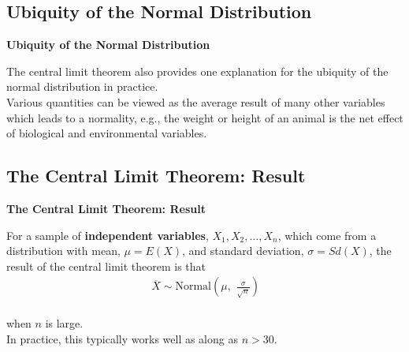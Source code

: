 \documentclass[compress]{beamer}        %
\makeatletter
\newcommand{\tcb}{\textcolor{beamer@blendedblue}}
\makeatother
\begin{document}
\subsection{Ubiquity of the Normal Distribution}
\begin{frame}{\bf \tcb{Ubiquity of the Normal Distribution}}

The central limit theorem also provides one explanation for the ubiquity of the normal distribution in practice.\\[1cm]

Various quantities can be viewed as the average result of many other variables which leads to a normality, e.g., the weight or height of an animal is the net effect of biological and environmental variables.

\end{frame}




\subsection{The Central Limit Theorem: Result}
\begin{frame}{\bf \tcb{The Central Limit Theorem: Result}}

For a sample of {\bf independent variables}, $X_1,X_2,\ldots,X_n$, which come from a distribution with mean, $\mu = E(X)$, and standard deviation, $\sigma = Sd(X)$, the result of the central limit theorem is that\\[-0.2cm]
\begin{align*}
\boxed{\,\overline{\!X} \sim \text{Normal}\left(\mu,\,\, \frac{\sigma}{\sqrt{n}}\right)}\\[-0.3cm]
\end{align*}

when $n$ is large.\\[0.8cm]

In practice, this typically works well as along as $\boxed{n > 30}$.

\end{frame}
\end{document}
